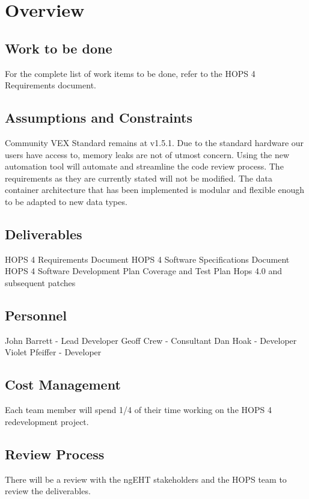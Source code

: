 %
%
\section{Overview}
\label{sec:overview}
\subsection{Work to be done}
For the complete list of work items to be done, refer to the HOPS 4 Requirements document.
\subsection{Assumptions and Constraints}
\begin{itemize}
Community VEX Standard remains at v1.5.1.
Due to the standard hardware our users have access to, memory leaks are not of utmost concern. 
Using the new automation tool will automate and streamline the code review process.
The requirements as they are currently stated will not be modified.
The data container architecture that has been implemented is modular and flexible enough to be adapted to new data types.
\end{itemize}

\subsection{Deliverables}
\begin{itemize}
HOPS 4 Requirements Document
HOPS 4 Software Specifications Document
HOPS 4 Software Development Plan
Coverage and Test Plan
Hops 4.0 and subsequent patches
\end{itemize}

\subsection{Personnel}
\begin{itemize}
John Barrett - Lead Developer
Geoff Crew - Consultant
Dan Hoak - Developer
Violet Pfeiffer - Developer
\end{itemize}

\subsection{Cost Management}
Each team member will spend 1/4 of their time working on the HOPS 4 redevelopment project.

\subsection{Review Process}
There will be a review with the ngEHT stakeholders and the HOPS team to review the deliverables.
%
%
